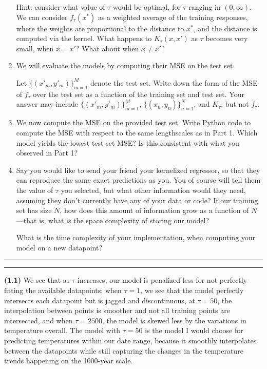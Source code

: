 \documentclass[submit]{harvardml}
\newcommand{\question}[2] {\vspace{.25in} \hrule\vspace{0.5em}
\noindent{\bf #1: #2} \vspace{0.5em}
\hrule \vspace{.10in}}
\renewcommand{\part}[1] {\vspace{.10in} {\bf (#1)}}
\begin{document}
\begin{problem}
\begin{enumerate}
Hint: consider what value of $\tau$ would be optimal, for $\tau$ ranging in $(0, \infty)$. We can consider $f_\tau(x^*)$ as a weighted average of the training responses, where the weights are proportional to the distance to $x^*$, and the distance is computed via the kernel. What happens to $K_\tau(x, x')$ as $\tau$ becomes very small, when $x = x'$? What about when $x \neq x'$?

\item We will evaluate the models by computing their MSE on the test set. 

Let $\{(x'_m, y'_m)\}_{m = 1} ^M$ denote the test set. Write down the form of the MSE of $f_\tau$ over the test set as a function of the training set and test set. Your answer may include $\{(x'_m, y'_m)\}_{m = 1} ^M$, $\{(x_n, y_n)\}_{n = 1} ^N$, and $K_\tau$, but not $f_\tau$.

\item We now compute the MSE on the provided test set. Write Python code to compute the MSE with respect to the same lengthscales as in Part 1. Which model yields the lowest test set MSE? Is this consistent with what you observed in Part 1?

\item 
Say you would like to send your friend your kernelized regressor, so that they can reproduce the same exact predictions as you. You of course will tell them the value of $\tau$ you selected, but what other information would they need, assuming they don't currently have any of your data or code? If our training set has size $N$, how does this amount of information grow as a function of $N$—that is, what is the space complexity of storing our model?

What is the time complexity of your implementation, when computing your model on a new datapoint? 
\end{enumerate}

\end{problem}

\newpage

\question{1}{Optimizing a Kernel}
\part{1.1} We see that as $\tau$ increases, our model is penalized less for not perfectly fitting the available datapoints: when $\tau=1$, we see that the model perfectly intersects each datapoint but is jagged and discontinuous, at $\tau=50$, the interpolation between points is smoother and not all training points are intersected, and when $\tau=2500$, the model is skewed less by the variations in temperature overall. The model with $\tau=50$ is the model I would choose for predicting temperatures within our date range, because it smoothly interpolates between the datapoints while still capturing the changes in the temperature trends happening on the 1000-year scale.
\end{document}
